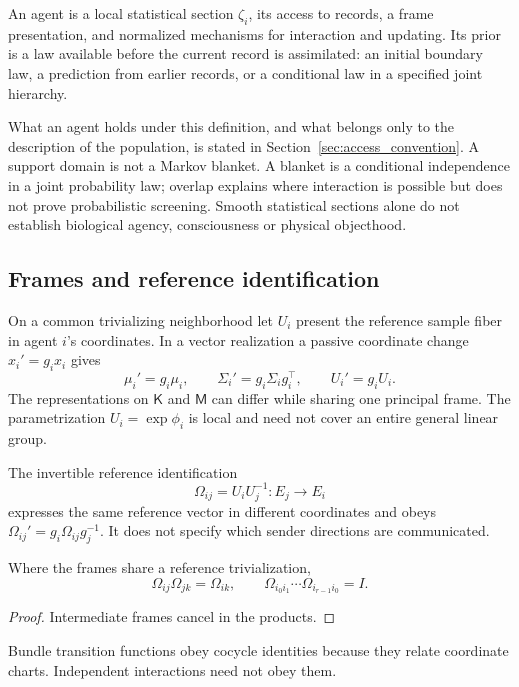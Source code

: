\begin{definition}\label{sec:agent_definition}
An agent is a local statistical section $\zeta_i$, its access to records, a frame presentation, and normalized mechanisms for interaction and updating. Its prior is a law available before the current record is assimilated: an initial boundary law, a prediction from earlier records, or a conditional law in a specified joint hierarchy.
\end{definition}
What an agent holds under this definition, and what belongs only to the description of the population, is stated in Section~\ref{sec:access_convention}. A support domain is not a Markov blanket. A blanket is a conditional independence in a joint probability law; overlap explains where interaction is possible but does not prove probabilistic screening. Smooth statistical sections alone do not establish biological agency, consciousness or physical objecthood.

\subsection{Frames and reference identification}
\label{sec:cognitive_reference_frames}\label{sec:transport}\label{sec:gauge_covariance_principle}
On a common trivializing neighborhood let $U_i$ present the reference sample fiber in agent $i$'s coordinates. In a vector realization a passive coordinate change $x_i'=g_i x_i$ gives
\begin{equation}
\mu_i'=g_i\mu_i,\qquad \Sigma_i'=g_i\Sigma_i g_i^\top,\qquad U_i'=g_iU_i.
\label{eq:frame_coordinate_law}
\end{equation}
The representations on $\mathsf K$ and $\mathsf M$ can differ while sharing one principal frame. The parametrization $U_i=\exp\phi_i$ is local and need not cover an entire general linear group.

The invertible reference identification
\begin{equation}
\Omega_{ij}=U_iU_j^{-1}:E_j\longrightarrow E_i
\label{eq:transport_def}
\end{equation}
expresses the same reference vector in different coordinates and obeys $\Omega_{ij}'=g_i\Omega_{ij}g_j^{-1}$. It does not specify which sender directions are communicated.
\begin{lemma}\label{thm:vanishing_holonomy}
Where the frames share a reference trivialization,
\begin{equation}
\Omega_{ij}\Omega_{jk}=\Omega_{ik},\qquad
\Omega_{i_0i_1}\cdots\Omega_{i_{r-1}i_0}=I.
\label{eq:holonomy}
\end{equation}
\end{lemma}
\begin{proof}
Intermediate frames cancel in the products.
\end{proof}
Bundle transition functions obey cocycle identities because they relate coordinate charts. Independent interactions need not obey them.

